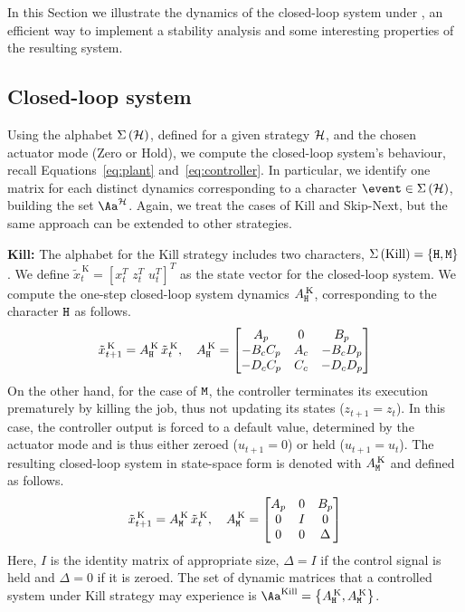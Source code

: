 In this Section we illustrate the dynamics of the closed-loop system under \ewhc{}, an efficient way to implement a stability analysis and some interesting properties of the resulting system.

\subsection{Closed-loop system}%
\label{sec:matrices}

Using the alphabet $\Sigma\left(\mathcal{H}\right)$, defined for a given strategy $\mathcal{H}$, and the chosen actuator mode (Zero or Hold), we compute the closed-loop system's behaviour, recall Equations~\eqref{eq:plant} and~\eqref{eq:controller}.
In particular, we identify one matrix for each distinct dynamics corresponding to a character $\event \in \Sigma\left( \strat \right)$, building the set $\Aa^\strat$.
Again, we treat the cases of Kill and Skip-Next, but the same approach can be extended to other strategies.

\textbf{Kill: }%
%
The alphabet for the Kill strategy includes two characters, $\Sigma\left(\text{Kill}\right) = \{ \texttt{H}, \texttt{M} \}$. We define $\tilde x_t^{\,\text{K}} = \left[ x_t^T\,\, z_t^T\,\, u_t^T \right]^T$ as the state vector for the closed-loop system.
We compute the one-step closed-loop system dynamics $A^{\,\text{K}}_{\texttt{H}}$, corresponding to the character $\texttt{H}$ as follows.
\begin{equation*}
    \tilde x_{t+1}^{\,\text{K}} = A^{\,\text{K}}_{\texttt{H}}\,\tilde x_t^{\,\text{K}}, \quad
     A^{\,\text{K}}_{\texttt{H}} = \begin{bmatrix}
        A_p       & 0    & B_p       \\
        -B_cC_p   & A_c  & -B_cD_p   \\
        -D_cC_p   & C_c  & -D_cD_p   \\
    \end{bmatrix}
\end{equation*}
%
On the other hand, for the case of $\texttt{M}$, the controller terminates its execution prematurely by killing the job, thus not updating its states ($z_{t+1} = z_t$).
In this case, the controller output is forced to a default value, determined by the actuator mode and is thus either zeroed ($u_{t+1} = 0$) or held ($u_{t+1} = u_t$).
The resulting closed-loop system in state-space form is denoted with $A^{\,\text{K}}_{\texttt{M}}$ and defined as follows.
\begin{equation*}
    \tilde x_{t+1}^{\,\text{K}} = A^{\,\text{K}}_{\texttt{M}}\,\tilde x_t^{\,\text{K}}, \quad
   A^{\,\text{K}}_{\texttt{M}} = \begin{bmatrix}
        A_p & 0  & B_p \\
        0   & I  & 0   \\
        0   & 0  & \Delta
    \end{bmatrix}
\end{equation*}
Here, $I$ is the identity matrix of appropriate size, $\Delta = I$ if the control signal is held and $\Delta = 0$ if it is zeroed.
The set of dynamic matrices that a controlled system under Kill strategy may experience is $\Aa^{\text{Kill}}=\left\{A^{\,\text{K}}_{\cH},A^{\,\text{K}}_{\cM}\right\}$.

